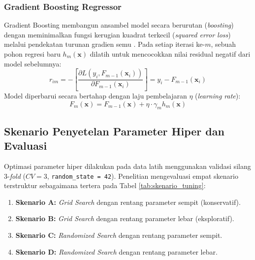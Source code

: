 \documentclass[10pt,a4paper]{article}
\begin{document}
\subsubsection{Gradient Boosting Regressor}
Gradient Boosting membangun ansambel model secara berurutan (\textit{boosting}) dengan meminimalkan fungsi kerugian kuadrat terkecil (\textit{squared error loss}) melalui pendekatan turunan gradien semu \cite{onwuegbuche2024}. Pada setiap iterasi ke-$m$, sebuah pohon regresi baru $h_m(\mathbf{x})$ dilatih untuk mencocokkan nilai residual negatif dari model sebelumnya:
\begin{equation}
  r_{im} = -\left[\frac{\partial L(y_i, F_{m-1}(\mathbf{x}_i))}{\partial F_{m-1}(\mathbf{x}_i)}\right] = y_i - F_{m-1}(\mathbf{x}_i)
  \label{eq:residual}
\end{equation}
Model diperbarui secara bertahap dengan laju pembelajaran $\eta$ (\textit{learning rate}):
\begin{equation}
  F_m(\mathbf{x}) = F_{m-1}(\mathbf{x}) + \eta \cdot \gamma_m h_m(\mathbf{x})
  \label{eq:gb_update}
\end{equation}

\subsection{Skenario Penyetelan Parameter Hiper dan Evaluasi}
Optimasi parameter hiper dilakukan pada data latih menggunakan validasi silang 3-\textit{fold} ($CV=3$, \texttt{random\_state = 42}). Penelitian mengevaluasi empat skenario terstruktur sebagaimana tertera pada Tabel \ref{tab:skenario_tuning}:
\begin{enumerate}
  \item \textbf{Skenario A:} \textit{Grid Search} dengan rentang parameter sempit (konservatif).
  \item \textbf{Skenario B:} \textit{Grid Search} dengan rentang parameter lebar (eksploratif).
  \item \textbf{Skenario C:} \textit{Randomized Search} dengan rentang parameter sempit.
  \item \textbf{Skenario D:} \textit{Randomized Search} dengan rentang parameter lebar.
\end{enumerate}
\end{document}
